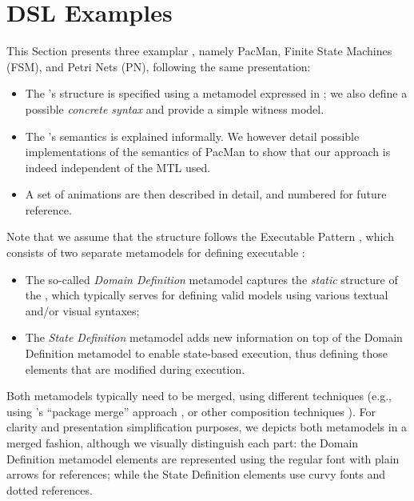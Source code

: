 \section{DSL Examples}
\label{sec:Examples}

This Section presents three examplar \DSLs, namely \textsf{PacMan}, Finite State
Machines (\textsf{FSM}), and Petri Nets (\textsf{PN}), following the same 
presentation:
\begin{itemize}
	\item The \DSL's structure is specified using a metamodel expressed in \MOF;
   we also define a possible \emph{concrete syntax} and provide a simple
   witness model.

   \item The \DSL's semantics is explained informally. We however detail possible
   implementations of the semantics of PacMan to show that our approach is indeed
   independent of the MTL used.

   \item A set of animations are then described in detail, and numbered for 
   future reference.
\end{itemize}
Note that we assume that the \DSL structure follows the Executable \DSML Pattern
\citep{Combemale-Cregut-Pantel:2012}, which consists of two separate metamodels for
defining executable \DSMLs:
\begin{itemize}
	\item The so-called \emph{Domain Definition} metamodel captures the 
   \emph{static} structure of the \DSL, which typically serves for defining valid
   models using various textual and/or visual syntaxes;
   
   \item The \emph{State Definition} metamodel adds new information on top of the
   Domain Definition metamodel to enable state-based execution, thus defining those
   elements that are modified during execution.
\end{itemize}
Both metamodels typically need to be merged, using different techniques (e.g.,
using \MOF's ``package merge'' approach \cite{TR:OMG-MOF:2016}, or other 
composition techniques \cite{J:Abouzahra-Sabraoui-Afdel:2020}).
For clarity and presentation simplification purposes, we depicts both metamodels
in a merged fashion, although we visually distinguish each part: the Domain Definition
metamodel elements are represented using the regular font with plain arrows for 
references; while the State Definition elements use curvy fonts and dotted references.








